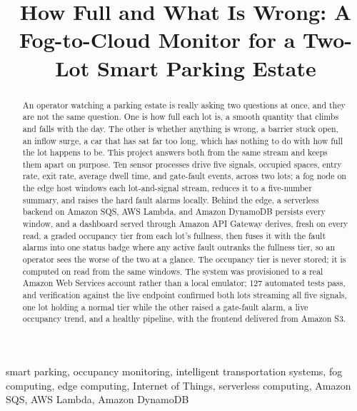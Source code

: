 \documentclass[conference]{IEEEtran}
\begin{document}
\title{How Full and What Is Wrong: A Fog-to-Cloud Monitor for a Two-Lot Smart Parking Estate}

\author{
}

\maketitle

\begin{abstract}
An operator watching a parking estate is really asking two questions at once, and they are not the same question. One is how full each lot is, a smooth quantity that climbs and falls with the day. The other is whether anything is wrong, a barrier stuck open, an inflow surge, a car that has sat far too long, which has nothing to do with how full the lot happens to be. This project answers both from the same stream and keeps them apart on purpose. Ten sensor processes drive five signals, occupied spaces, entry rate, exit rate, average dwell time, and gate-fault events, across two lots; a fog node on the edge host windows each lot-and-signal stream, reduces it to a five-number summary, and raises the hard fault alarms locally. Behind the edge, a serverless backend on Amazon SQS, AWS Lambda, and Amazon DynamoDB persists every window, and a dashboard served through Amazon API Gateway derives, fresh on every read, a graded occupancy tier from each lot's fullness, then fuses it with the fault alarms into one status badge where any active fault outranks the fullness tier, so an operator sees the worse of the two at a glance. The occupancy tier is never stored; it is computed on read from the same windows. The system was provisioned to a real Amazon Web Services account rather than a local emulator; 127 automated tests pass, and verification against the live endpoint confirmed both lots streaming all five signals, one lot holding a normal tier while the other raised a gate-fault alarm, a live occupancy trend, and a healthy pipeline, with the frontend delivered from Amazon S3.
\end{abstract}

\begin{IEEEkeywords}
smart parking, occupancy monitoring, intelligent transportation systems, fog computing, edge computing, Internet of Things, serverless computing, Amazon SQS, AWS Lambda, Amazon DynamoDB
\end{IEEEkeywords}
\end{document}
